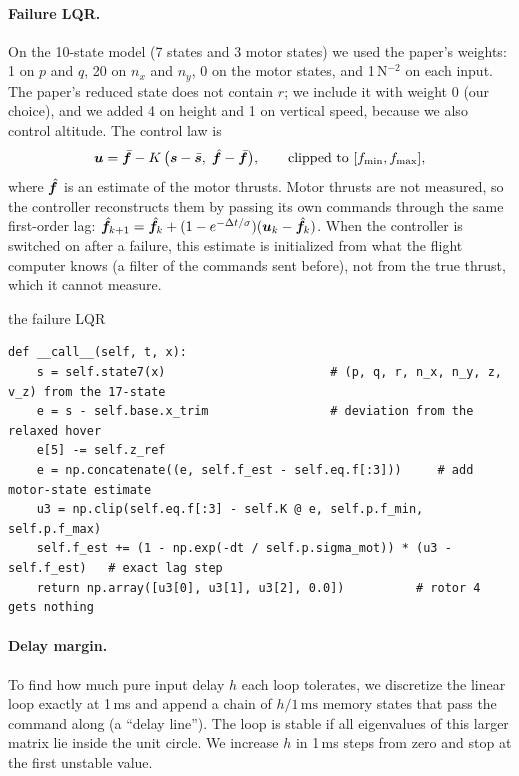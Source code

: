 \paragraph{Failure LQR.} On the 10-state model (7 states and 3 motor states) we used the paper's weights: 1 on $p$ and $q$, 20 on $n_x$ and $n_y$, 0 on the motor states, and 1\,N$^{-2}$ on each input. The paper's reduced state does not contain $r$; we include it with weight 0 (our choice), and we added 4 on height and 1 on vertical speed, because we also control altitude. The control law is
\begin{equation}
  \boldsymbol{u} = \bar{\boldsymbol{f}} - K\,\big(\boldsymbol{s} - \bar{\boldsymbol{s}},\; \hat{\boldsymbol{f}} - \bar{\boldsymbol{f}}\big), \qquad \text{clipped to } [f_{\min}, f_{\max}],
\end{equation}
where $\hat{\boldsymbol{f}}$ is an estimate of the motor thrusts. Motor thrusts are not measured, so the controller reconstructs them by passing its own commands through the same first-order lag: $\hat{\boldsymbol{f}}_{k+1} = \hat{\boldsymbol{f}}_k + (1-e^{-\Delta t/\sigma})(\boldsymbol{u}_k - \hat{\boldsymbol{f}}_k)$. When the controller is switched on after a failure, this estimate is initialized from what the flight computer knows (a filter of the commands sent before), not from the true thrust, which it cannot measure.

\begin{codebox}{the failure LQR}
\begin{lstlisting}
def __call__(self, t, x):
    s = self.state7(x)                       # (p, q, r, n_x, n_y, z, v_z) from the 17-state
    e = s - self.base.x_trim                 # deviation from the relaxed hover
    e[5] -= self.z_ref
    e = np.concatenate((e, self.f_est - self.eq.f[:3]))     # add motor-state estimate
    u3 = np.clip(self.eq.f[:3] - self.K @ e, self.p.f_min, self.p.f_max)
    self.f_est += (1 - np.exp(-dt / self.p.sigma_mot)) * (u3 - self.f_est)   # exact lag step
    return np.array([u3[0], u3[1], u3[2], 0.0])          # rotor 4 gets nothing
\end{lstlisting}
\end{codebox}

\paragraph{Delay margin.} To find how much pure input delay $h$ each loop tolerates, we discretize the linear loop exactly at 1\,ms and append a chain of $h/1\,\text{ms}$ memory states that pass the command along (a ``delay line''). The loop is stable if all eigenvalues of this larger matrix lie inside the unit circle. We increase $h$ in 1\,ms steps from zero and stop at the first unstable value.

